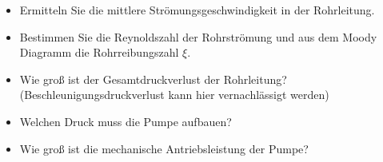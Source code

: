 \documentclass[a4paper,11pt]{article}
\begin{document}
\begin{itemize}
\item Ermitteln Sie die mittlere Strömungsgeschwindigkeit in der Rohrleitung.
\item Bestimmen Sie die Reynoldszahl der Rohrströmung und aus dem Moody Diagramm die Rohrreibungszahl $\xi$.
\item Wie groß ist der Gesamtdruckverlust der Rohrleitung? (Beschleunigungsdruckverlust kann hier vernachlässigt werden)
\item Welchen Druck muss die Pumpe aufbauen? 
\item Wie groß ist die mechanische Antriebsleistung der Pumpe? 
\end{itemize}

\pp
%
%
\begin{table}[h]
\caption{Werte für Aufgabe 5}
\end{table}
\end{document}
